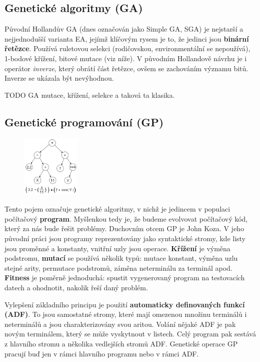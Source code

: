 \subsection{Genetické algoritmy (GA)}
Původní Hollandův GA (dnes označován jako Simple GA, SGA) je nejstarší a nejjednodušší varianta EA, jejímž klíčovým rysem je to, že jedinci jsou \textbf{binární řetězce}. Používá ruletovou selekci (rodičovskou, environmentální se nepoužívá), 1-bodové křížení, bitové mutace (viz níže). V původním Hollandově návrhu je i operátor \textit{inverze}, který obrátí část řetězce, ovšem se zachováním významu bitů. Inverze se ukázala být nevýhodnou.


TODO GA mutace, křížení, selekce a taková ta klasika.

\subsection{Genetické programování (GP)}
\begin{figure}
\centering
\includegraphics[width=0.25\textwidth]{img/gp.png}
\end{figure}
Tento pojem označuje genetické algoritmy, v nichž je jedincem v populaci počítačový \textbf{program}. Myšlenkou tedy je, že budeme evolvovat počítačový kód, který za nás bude řešit problémy. Duchovním otcem GP je John Koza. V jeho původní práci jsou programy reprezentovány jako syntaktické stromy, kde listy jsou proměnné a konstanty, vnitřní uzly jsou operace. \textbf{Křížení} je výměna podstromu, \textbf{mutací} se používá několik typů: mutace konstant, výměna uzlu stejné arity, permutace podstromů, záměna neterminálu za terminál apod. \textbf{Fitness} je poměrně jednoduchá: spustit vygenerovaný program na testovacích datech a ohodnotit, nakolik řeší daný problém.

Vylepšení základního principu je použití \textbf{automaticky definovaných funkcí (ADF)}. To jsou samostatné stromy, které mají omezenou množinu terminálů i neterminálů a jsou charakterizovány svou aritou. Volání nějaké ADF je pak novým terminálem, který se může vyskytnout v listech. Celý program pak sestává z hlavního stromu a několika vedlejších stromů ADF. Genetické operace GP pracují buď jen v rámci hlavního programu nebo v rámci ADF.

